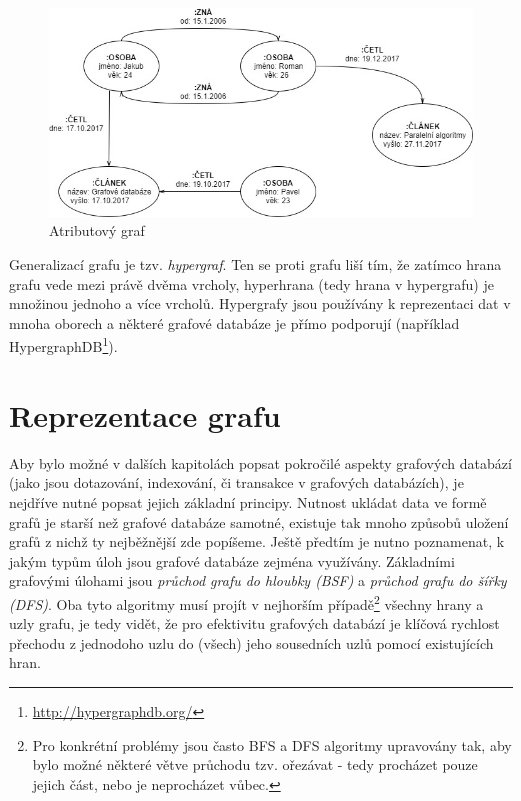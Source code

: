 \begin{figure}
\begin{center}
\includegraphics[width=12cm]{figures/property_graph}
\caption{Atributový graf}
\label{fig:property_graf}
\end{center}
\end{figure}

Generalizací grafu je tzv. \textit{hypergraf}. Ten se proti grafu liší tím, že zatímco hrana grafu vede mezi právě dvěma vrcholy, hyperhrana (tedy hrana v hypergrafu) je množinou jednoho a více vrcholů.\cite{Diestel00} Hypergrafy jsou používány k reprezentaci dat v mnoha oborech a některé grafové databáze je přímo podporují (například HypergraphDB\footnote{\url{http://hypergraphdb.org/}}).


\section{Reprezentace grafu}
\label{sec:gdb-reprezentace}
Aby bylo možné v dalších kapitolách popsat pokročilé aspekty grafových databází (jako jsou dotazování, indexování, či transakce v grafových databázích), je nejdříve nutné popsat jejich základní principy. Nutnost ukládat data ve formě grafů je starší než grafové databáze samotné, existuje tak mnoho způsobů uložení grafů z nichž ty nejběžnější zde popíšeme. Ještě předtím je nutno poznamenat, k jakým typům úloh jsou grafové databáze zejména využívány. Základními grafovými úlohami jsou \textit{průchod grafu do hloubky (BSF)} a \textit{průchod grafu do šířky (DFS)}. Oba tyto algoritmy musí projít v nejhorším případě\footnote{Pro konkrétní problémy jsou často BFS a DFS algoritmy upravovány tak, aby bylo možné některé větve průchodu tzv. ořezávat - tedy procházet pouze jejich část, nebo je neprocházet vůbec.} všechny hrany a uzly grafu, je tedy vidět, že pro efektivitu grafových databází je klíčová rychlost přechodu z jednodoho uzlu do (všech) jeho sousedních uzlů pomocí existujících hran.

